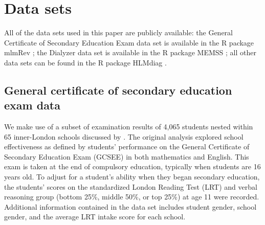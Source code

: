 \documentclass[12pt]{article} %
\begin{document}
\section{Data sets}\label{sec:datasets}

All of the data sets used in this paper are publicly available: the General Certificate of Secondary Education Exam data set is available in the R package mlmRev \citep{mlmRev}; the Dialyzer data set is available in the R package MEMSS \citep{MEMSS}; all other data sets can be found in the R package HLMdiag \citep{HLMDiag}.

\subsection{General certificate of secondary education exam data}\label{data:GCSE}

We make use of a subset of examination results of 4,065 students nested within 65 inner-London schools discussed by \cite{Goldstein:1993wm}. The original analysis explored school effectiveness as defined by students' performance on the General Certificate of Secondary Education Exam (GCSEE) in both mathematics and English. This exam is taken at the end of compulsory education, typically when students are 16 years old.  To adjust for a student's ability when they began secondary education, the students' scores on the standardized London Reading Test (LRT) and verbal reasoning group (bottom 25\%, middle 50\%, or top 25\%) at age 11 were recorded. Additional information contained in the data set includes student gender, school gender, and the average LRT intake score for each school. 
\end{document}
